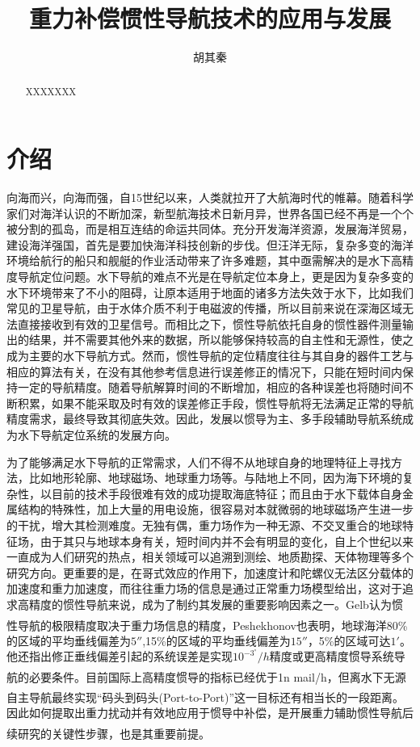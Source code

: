 \documentclass[12pt,a4,utf8]{article}
\title{重力补偿惯性导航技术的应用与发展}
\author{胡其秦}
\newcommand{\upcite}[1]{\textsuperscript{\textsuperscript{\cite{#1}}}} %
\begin{document}
\maketitle

\begin{abstract}
      XXXXXXX
\end{abstract}

\section{介绍}

向海而兴，向海而强，自15世纪以来，人类就拉开了大航海时代的帷幕。随着科学家们对海洋认识的不断加深，新型航海技术日新月异，世界各国已经不再是一个个被分割的孤岛，而是相互连结的命运共同体。充分开发海洋资源，发展海洋贸易，建设海洋强国，首先是要加快海洋科技创新的步伐。但汪洋无际，复杂多变的海洋环境给航行的船只和舰艇的作业活动带来了许多难题，其中亟需解决的是水下高精度导航定位问题。水下导航的难点不光是在导航定位本身上，更是因为复杂多变的水下环境带来了不小的阻碍，让原本适用于地面的诸多方法失效于水下，比如我们常见的卫星导航，由于水体介质不利于电磁波的传播，所以目前来说在深海区域无法直接接收到有效的卫星信号。而相比之下，惯性导航依托自身的惯性器件测量输出的结果，并不需要其他外来的数据，所以能够保持较高的自主性和无源性，使之成为主要的水下导航方式。然而，惯性导航的定位精度往往与其自身的器件工艺与相应的算法有关，在没有其他参考信息进行误差修正的情况下，只能在短时间内保持一定的导航精度。随着导航解算时间的不断增加，相应的各种误差也将随时间不断积累，如果不能采取及时有效的误差修正手段，惯性导航将无法满足正常的导航精度需求，最终导致其彻底失效。因此，发展以惯导为主、多手段辅助导航系统成为水下导航定位系统的发展方向。

为了能够满足水下导航的正常需求，人们不得不从地球自身的地理特征上寻找方法，比如地形轮廓、地球磁场、地球重力场等。与陆地上不同，因为海下环境的复杂性，以目前的技术手段很难有效的成功提取海底特征；而且由于水下载体自身金属结构的特殊性，加上大量的用电设施，很容易对本就微弱的地球磁场产生进一步的干扰，增大其检测难度。无独有偶，重力场作为一种无源、不交叉重合的地球特征场，由于其只与地球本身有关，短时间内并不会有明显的变化，自上个世纪以来一直成为人们研究的热点，相关领域可以追溯到测绘、地质勘探、天体物理等多个研究方向。更重要的是，在哥式效应的作用下，加速度计和陀螺仪无法区分载体的加速度和重力加速度，而往往重力场的信息是通过正常重力场模型给出，这对于追求高精度的惯性导航来说，成为了制约其发展的重要影响因素之一。Gelb认为惯性导航的极限精度取决于重力场信息的精度\upcite{gelb1968geodetic}，Peshekhonov也表明\upcite{peshekhonov2020problem}，地球海洋80\%的区域的平均垂线偏差为$5''$,15\%的区域的平均垂线偏差为$15''$，5\%的区域可达$1'$。他还指出修正垂线偏差引起的系统误差是实现$10^{-3^{\circ} }/h$精度或更高精度惯导系统导航的必要条件。目前国际上高精度惯导的指标已经优于1n mail/h\upcite{article}，但离水下无源自主导航最终实现“码头到码头(Port-to-Port)”这一目标还有相当长的一段距离\upcite{moryl1997advanced}。因此如何提取出重力扰动并有效地应用于惯导中补偿，是开展重力辅助惯性导航后续研究的关键性步骤，也是其重要前提\upcite{WHCH20240724001}。
\end{document}
